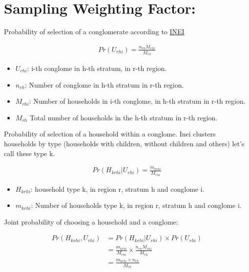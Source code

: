 \section{Sampling Weighting Factor:}


Probability of selection of a conglomerate according to \href{https://www.inei.gob.pe/media/MenuRecursivo/publicaciones_digitales/Est/Lib1795/pdf/ApendiceA.pdf}{INEI}

\begin{align*}
    Pr(U_{rhi}) = \frac{n_{rh} M_{rhi}}{M_{rh}}
\end{align*}


\begin{itemize}
    \item $U_{rhi}$: i-th conglome in h-th stratum, in r-th region.
    \item $n_{rh}$: Number of conglome in h-th stratum in r-th region.
    \item $M_{rhi}$: Number of households in i-th conglome, in h-th stratum in r-th region.
    \item $M_{rh}$ Total number of households in the h-th stratum in r-th region.
\end{itemize}

Probability of selection of a household within a conglome. Inei clusters households by type (households with children, without children and others) let's call these type k.

\begin{align*}
    Pr(H_{krhi} | U_{rhi}) = \frac{m_{krhi}}{M_{rhi}}
\end{align*}


\begin{itemize}
    \item $H_{krhi}$: household type k, in region r, stratum h and conglome i.
    \item $m_{krhi}$: Number of households type k, in region r, stratum h and conglome i.
\end{itemize}

Joint probability of choosing a household and a conglome:

\begin{align*}
    Pr(H_{krhi}, U_{rhi}) &=  Pr(H_{krhi} | U_{rhi}) \times Pr(U_{rhi})\\ 
    &= \frac{m_{krhi}}{M_{rhi}}\times \frac{n_{rh} M_{rhi}}{M_{rh}}\\
    &= \frac{m_{krhi}\times n_{rh}}{M_{rh}}
\end{align*}

